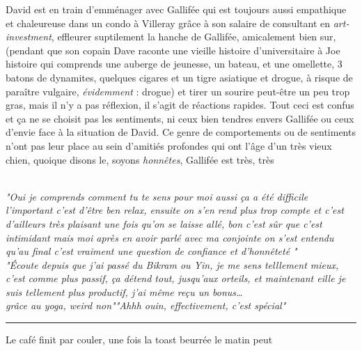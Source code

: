 \begin{paracol}{2}
\begin{rightcolumn} David est en train d'emménager avec Gallifée qui est
            toujours aussi empathique et chaleureuse dans un condo à Villeray
	    grâce à son salaire de consultant en \textit{art-investment}, 
    effleurer suptilement la hanche de Gallifée, amicalement bien sur, (pendant
    que son copain Dave raconte une vieille histoire d'universitaire à Joe
    histoire qui comprends une auberge de jeunesse, un bateau, et une
    omellette, 3 batons de dynamites, quelques cigares et un tigre asiatique et
    drogue, à risque de paraître vulgaire, \emph{évidemment} : drogue)
    et tirer un sourire peut-être un peu trop gras, mais il
    n'y a pas réflexion, il s'agit de réactions rapides. Tout ceci est
    confus et ça ne se choisit pas les sentiments, ni ceux bien tendres envers
    Gallifée ou ceux d'envie face à la situation de David. Ce genre de
    comportements ou de sentiments n'ont pas leur place au sein d'amitiés
    profondes qui ont
    l'âge d'un très vieux chien, quoique disons le,
    soyons \emph{honnêtes}, Gallifée est très, très  \\
\end{rightcolumn}
\begin{leftcolumn} \phantom\\\vspace{5em}
 \phantom{}
\small
            \textit{"Oui je comprends comment tu te sens pour moi aussi ça a été
                difficile l'important c'est d'être ben relax, ensuite on s'en
                rend plus trop compte et c'est d'ailleurs très plaisant une fois
                qu'on se laisse allé, bon c'est sûr que c'est intimidant mais
        moi après en avoir parlé avec ma conjointe on s'est entendu qu'au final
c'est vraiment une question de confiance et d'honnêteté \textelp{}"}\\[10em]
\textit{"Écoute depuis que j'ai passé du Bikram ou Yin, je me sens telllement
	mieux, c'est comme plus passif, ça détend tout, jusqu'aux orteils, et
	maintenant eille je suis tellement plus productif, j'ai même reçu un
	bonus\ldots\\grâce au yoga, weird non""Ahhh ouin, effectivement, c'est
spécial"}
\end{leftcolumn}
\end{paracol}
\begin{center}\noindent\rule{0.5\textwidth}{0.4pt}\end{center}
Le café finit par couler, une fois la toast beurrée le matin peut
